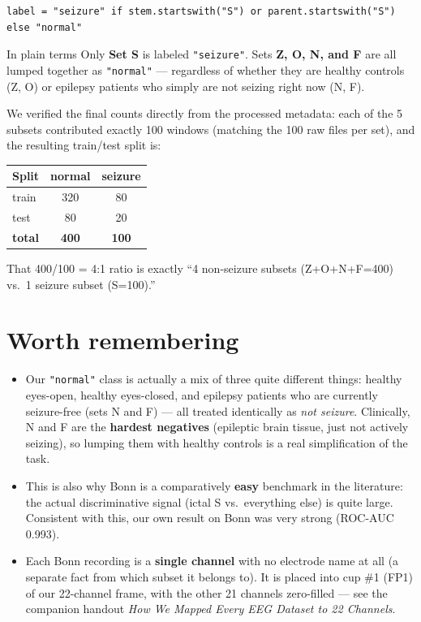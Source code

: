 \documentclass[11pt]{article}
\begin{document}
\begin{lstlisting}
label = "seizure" if stem.startswith("S") or parent.startswith("S") else "normal"
\end{lstlisting}

\begin{keybox}{In plain terms}
Only \textbf{Set S} is labeled \texttt{"seizure"}. Sets \textbf{Z, O, N, and F}
are all lumped together as \texttt{"normal"} --- regardless of whether they
are healthy controls (Z, O) or epilepsy patients who simply are not seizing
right now (N, F).
\end{keybox}

We verified the final counts directly from the processed metadata: each of the
5 subsets contributed exactly 100 windows (matching the 100 raw files per
set), and the resulting train/test split is:

\begin{center}
\begin{tabular}{@{}lcc@{}}
\toprule
Split & normal & seizure \\
\midrule
train & 320 & 80 \\
test  & 80  & 20 \\
\midrule
\textbf{total} & \textbf{400} & \textbf{100} \\
\bottomrule
\end{tabular}
\end{center}

That 400/100 = 4:1 ratio is exactly ``4 non-seizure subsets (Z+O+N+F=400) vs.\
1 seizure subset (S=100).''

\section{Worth remembering}
\begin{itemize}[nosep,leftmargin=1.4em]
  \item Our \texttt{"normal"} class is actually a mix of three quite different
  things: healthy eyes-open, healthy eyes-closed, and epilepsy patients who
  are currently seizure-free (sets N and F) --- all treated identically as
  \emph{not seizure}. Clinically, N and F are the \textbf{hardest negatives}
  (epileptic brain tissue, just not actively seizing), so lumping them with
  healthy controls is a real simplification of the task.
  \item This is also why Bonn is a comparatively \textbf{easy} benchmark in
  the literature: the actual discriminative signal (ictal S vs.\ everything
  else) is quite large. Consistent with this, our own result on Bonn was very
  strong (ROC-AUC 0.993).
  \item Each Bonn recording is a \textbf{single channel} with no electrode
  name at all (a separate fact from which subset it belongs to). It is placed
  into cup \#1 (FP1) of our 22-channel frame, with the other 21 channels
  zero-filled --- see the companion handout
  \emph{How We Mapped Every EEG Dataset to 22 Channels}.
\end{itemize}
\end{document}
